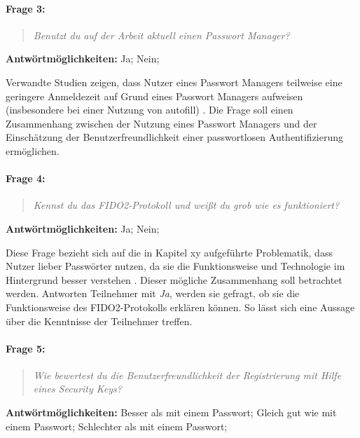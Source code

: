 \paragraph{Frage 3:}

\begin{quote}
    \textit{Benutzt du auf der Arbeit aktuell einen Passwort Manager?}
\end{quote}

\textbf{Antwörtmöglichkeiten:} Ja; Nein;

Verwandte Studien zeigen, dass Nutzer eines Passwort Managers teilweise eine geringere Anmeldezeit auf Grund eines Passwort Managers aufweisen (insbesondere bei einer Nutzung von autofill) \cite{farke2020you}. Die Frage soll einen Zusammenhang zwischen der Nutzung eines Passwort Managers und der Einschätzung der Benutzerfreundlichkeit einer passwortlosen Authentifizierung ermöglichen.

\paragraph{Frage 4:}

\begin{quote}
    \textit{Kennst du das FIDO2-Protokoll und weißt du grob wie es funktioniert?}
\end{quote}

\textbf{Antwörtmöglichkeiten:} Ja; Nein;

Diese Frage bezieht sich auf die in Kapitel xy aufgeführte Problematik, dass Nutzer lieber Passwörter nutzen, da sie die Funktionsweise und Technologie im Hintergrund besser verstehen \cite{lyastani2020fido}. Dieser mögliche Zusammenhang soll betrachtet werden. Antworten Teilnehmer mit \textit{Ja}, werden sie gefragt, ob sie die Funktionsweise des FIDO2-Protokolls erklären können. So lässt sich eine Aussage über die Kenntnisse der Teilnehmer treffen. 

\paragraph{Frage 5:}

\begin{quote}
    \textit{Wie bewertest du die Benutzerfreundlichkeit der Registrierung mit Hilfe eines Security Keys?}
\end{quote}

\textbf{Antwörtmöglichkeiten:} Besser als mit einem Passwort; Gleich gut wie mit einem Passwort; Schlechter als mit einem Passwort;

